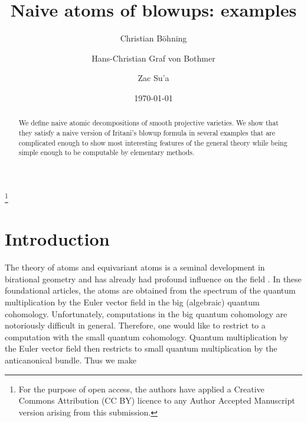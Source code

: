 \documentclass[11pt]{amsart}
\theoremstyle{plain}
\numberwithin{equation}{section}
\theoremstyle{definition}
\theoremstyle{remark}
\begin{document}
\title[Naive atoms of blowups: examples]{Naive atoms of blowups: examples}

\author[B\"ohning]{Christian B\"ohning}\thanks{For the purpose of open access, the authors have applied a Creative Commons Attribution (CC BY) licence to any Author Accepted Manuscript version arising from this submission.}
\address{Christian B\"ohning, Mathematics Institute, University of Warwick\\
Coventry CV4 7AL, England}

\author[von Bothmer]{Hans-Christian Graf von Bothmer}
\address{Hans-Christian Graf von Bothmer, Fachbereich Mathematik der Universit\"at Hamburg\\
Bundesstra\ss e 55\\
20146 Hamburg, Germany}

\author[Su'a]{Zac Su'a}
\address{Zac Su'a, Mathematics Institute, University of Warwick\\
Coventry CV4 7AL, England}



\date{\today}


\begin{abstract}
We define naive atomic decompositions of smooth projective varieties. We show that they satisfy a naive version of Iritani's blowup formula in several examples that are complicated enough to show most interesting features of the general theory while being simple enough to be computable by elementary methods. 
\end{abstract}

\maketitle 

\section{Introduction}\label{sIntroduction}

The theory of atoms and equivariant atoms \cite{KKPY25, CKK25} is a seminal development in birational geometry and has already had profound influence on the field \cite{ESS25, BGMP26, Fay26}. In these foundational articles, the atoms are obtained from the spectrum of the quantum multiplication by the Euler vector field in the big (algebraic) quantum cohomology. Unfortunately, computations in the big quantum cohomology are notoriously difficult in general. Therefore, one would like to restrict to a computation with the small quantum cohomology. Quantum multiplication by the Euler vector field then restricts to small quantum multiplication by the anticanonical bundle. Thus we make %
\end{document}
